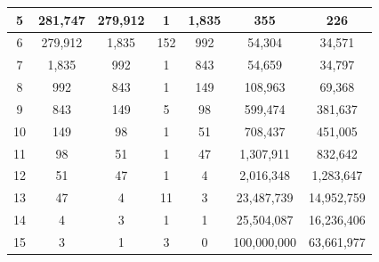 \documentclass{esub2acm}
\begin{document}
\begin{table}
\begin{center}
\begin{tabular}{|c|c|c|c|c|c|c|}
\hline
\small{5}     & \small{281,747}       & \small{279,912}     & \small{1}       & \small{1,835}         & \small{355}        & \small{226}         \\
\hline
\small{6}     & \small{279,912}       & \small{1,835}       & \small{152}     & \small{992}           & \small{54,304}     & \small{34,571}      \\
\hline
\small{7}     & \small{1,835}         & \small{992}         & \small{1}       & \small{843}           & \small{54,659}     & \small{34,797}      \\
\hline
\small{8}     & \small{992}           & \small{843}         & \small{1}       & \small{149}           & \small{108,963}    & \small{69,368}      \\
\hline
\small{9}     & \small{843}           & \small{149}         & \small{5}       & \small{98}            & \small{599,474}    & \small{381,637}     \\
\hline
\small{10}    & \small{149}           & \small{98}          & \small{1}       & \small{51}            & \small{708,437}    & \small{451,005}     \\
\hline
\small{11}    & \small{98}            & \small{51}          & \small{1}       & \small{47}            & \small{1,307,911}  & \small{832,642}     \\
\hline
\small{12}    & \small{51}            & \small{47}          & \small{1}       & \small{4}             & \small{2,016,348}  & \small{1,283,647}   \\
\hline
\small{13}    & \small{47}            & \small{4}           & \small{11}      & \small{3}             & \small{23,487,739} & \small{14,952,759}  \\
\hline
\small{14}    & \small{4}             & \small{3}           & \small{1}       & \small{1}             & \small{25,504,087} & \small{16,236,406}  \\
\hline
\small{15}    & \small{3}             & \small{1}           & \small{3}       & \small{0}             & \small{100,000,000}& \small{63,661,977}  \\
\hline
\end{tabular}
\end{center}
\end{table}
\end{document}

